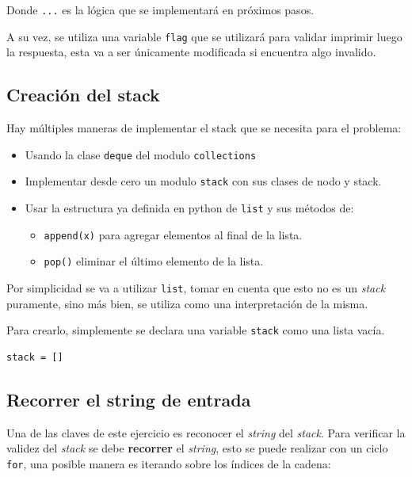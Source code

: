 \documentclass{article}
\begin{document}
Donde \texttt{...} es la lógica que se implementará en próximos pasos.

A su vez, se utiliza una variable \texttt{flag} que se utilizará para validar imprimir luego la respuesta, esta va a ser únicamente modificada si encuentra algo invalido.


\subsection{Creación del stack}

Hay múltiples maneras de implementar el stack que se necesita para el problema:

\begin{itemize}
  \item Usando la clase \lstinline[style=pythonstyle]{deque} del modulo \lstinline[style=pythonstyle]{collections}
  \item Implementar desde cero un modulo \texttt{stack} con sus clases de nodo y stack.
  \item Usar la estructura ya definida en python de \lstinline[style=pythonstyle]{list} y sus métodos de:
        \begin{itemize}
          \item \lstinline[style=pythonstyle]{append(x)} para agregar elementos al final de la lista.
          \item \lstinline[style=pythonstyle]{pop()} eliminar el último elemento de la lista.
        \end{itemize}
\end{itemize}

Por simplicidad se va a utilizar \lstinline[style=pythonstyle]{list}, tomar en cuenta que esto no es un \textit{stack} puramente, sino más bien, se utiliza como una interpretación de la misma.

Para crearlo, simplemente se declara una variable \texttt{stack} como una lista vacía.

\begin{lstlisting}[style=pythonstyle]
stack = []
\end{lstlisting}


\subsection{Recorrer el string de entrada}

Una de las claves de este ejercicio es reconocer el \textit{string} del \textit{stack}. Para verificar la validez del \textit{stack} se debe \textbf{recorrer} el \textit{string}, esto se puede realizar con un ciclo \lstinline[style=pythonstyle]{for}, una posible manera es iterando sobre los índices de la cadena:
\end{document}
